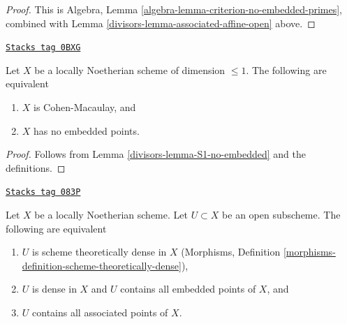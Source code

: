 \begin{proof}

This is Algebra, Lemma \ref{algebra-lemma-criterion-no-embedded-primes},
combined with Lemma \ref{divisors-lemma-associated-affine-open} above.
\end{proof}

\begin{lemma}
\label{divisors-lemma-noetherian-dim-1-CM-no-embedded-points}
\href{https://stacks.math.columbia.edu/tag/0BXG}{\texttt{Stacks tag 0BXG}}

Let $X$ be a locally Noetherian scheme of dimension $\leq 1$.
The following are equivalent
\begin{enumerate}
\item $X$ is Cohen-Macaulay, and
\item $X$ has no embedded points.
\end{enumerate}
\end{lemma}

\begin{proof}

Follows from Lemma \ref{divisors-lemma-S1-no-embedded} and the definitions.
\end{proof}

\begin{lemma}
\label{divisors-lemma-scheme-theoretically-dense-contain-embedded-points}
\href{https://stacks.math.columbia.edu/tag/083P}{\texttt{Stacks tag 083P}}

Let $X$ be a locally Noetherian scheme. Let $U \subset X$ be an
open subscheme. The following are equivalent
\begin{enumerate}
\item $U$ is scheme theoretically dense in $X$
(Morphisms, Definition \ref{morphisms-definition-scheme-theoretically-dense}),
\item $U$ is dense in $X$ and $U$ contains all embedded points of $X$, and
\item $U$ contains all associated points of $X$.
\end{enumerate}
\end{lemma}

